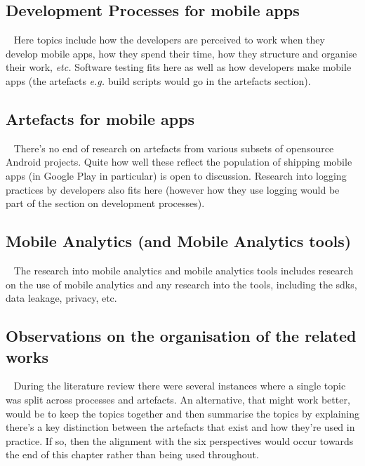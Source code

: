 \subsection{Development Processes for mobile apps}~\label{rw-devt-processes-for-mobile-apps}
Here topics include how the developers are perceived to work when they develop mobile apps, how they spend their time, how they structure and organise their work, \emph{etc.} Software testing fits here as well as how developers make mobile apps (the artefacts \emph{e.g.} build scripts would go in the artefacts section).

\subsection{Artefacts for mobile apps}~\label{rw-artefacts-for-mobile-apps}
There's no end of research on artefacts from various subsets of opensource Android projects. Quite how well these reflect the population of shipping mobile apps (in Google Play in particular) is open to discussion. Research into logging practices by developers also fits here (however how they use logging would be part of the section on development processes).

\subsection{Mobile Analytics (and Mobile Analytics tools)}~\label{rw-mobile-analytics-and-tools-topic}
The research into mobile analytics and mobile analytics tools includes research on the use of mobile analytics and any research into the tools, including the \Glspl{sdk}, data leakage, privacy, etc.

\subsection{Observations on the organisation of the related works}~\label{rw-thoughts-on-organisation-of-the-rw}
During the literature review there were several instances where a single topic was split across processes and artefacts. An alternative, that might work better, would be to keep the topics together and then summarise the topics by explaining there's a key distinction between the artefacts that exist and how they're used in practice. If so, then the alignment with the six perspectives would occur towards the end of this chapter rather than being used throughout.

